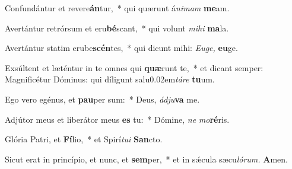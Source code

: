 \item Confundántur et revere\textbf{án}tur,~* qui quærunt á\hspace{0.03em}\textit{nimam} \textbf{me}am.
\item Avertántur retrórsum et eru\textbf{bé}scant,~* qui volunt \textit{mihi} \textbf{ma}la.
\item Avertántur statim erube\textbf{scén}tes,~* qui dicunt mihi: \textit{Euge,} \textbf{eu}ge.
\item Exsúltent et læténtur in te omnes qui \textbf{quæ}runt te,~* et dicant semper: Magnificétur Dóminus: qui díligunt salu\kern 0.02em\textit{táre} \textbf{tu}um.
\item Ego vero egénus, et \textbf{pau}per sum:~* Deus, \textit{ádju}\textbf{va} me.
\item Adjútor meus et liberátor meus \textbf{es} tu:~* Dómine, \textit{ne} \textit{mo}\textbf{ré}ris.
\item Glória Patri, et \textbf{Fí}lio,~* et Spirí\hspace{0.03em}\textit{tui} \textbf{San}cto.
\item Sicut erat in princípio, et nunc, et \textbf{sem}per,~* et in sǽcula sæcu\hspace{0.03em}\textit{lórum.} \textbf{A}men.
